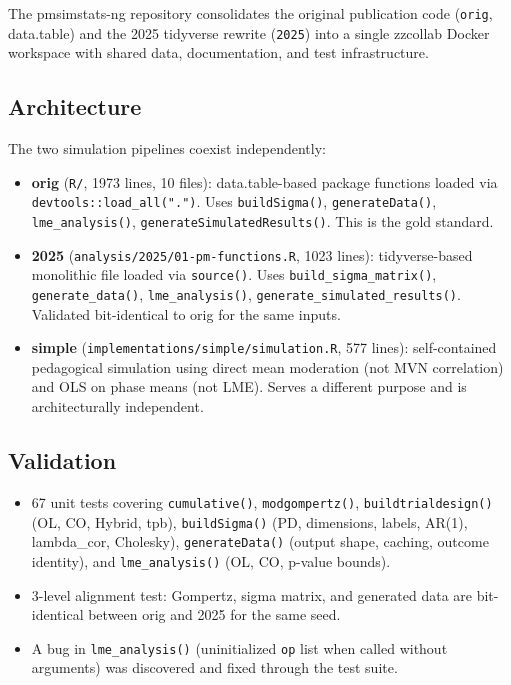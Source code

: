 \documentclass[11pt]{article}
\begin{document}
The pmsimstats-ng repository consolidates the original
publication code (\texttt{orig}, data.table) and the 2025 tidyverse
rewrite (\texttt{2025}) into a single zzcollab Docker workspace with
shared data, documentation, and test infrastructure.

\subsection{Architecture}

The two simulation pipelines coexist independently:

\begin{itemize}
  \item \textbf{orig} (\texttt{R/}, 1973 lines, 10 files): data.table-based
    package functions loaded via \texttt{devtools::load\_all(".")}. Uses
    \texttt{buildSigma()}, \texttt{generateData()}, \texttt{lme\_analysis()},
    \texttt{generateSimulatedResults()}. This is the gold standard.

  \item \textbf{2025} (\texttt{analysis/2025/01-pm-functions.R}, 1023 lines):
    tidyverse-based monolithic file loaded via \texttt{source()}. Uses
    \texttt{build\_sigma\_matrix()}, \texttt{generate\_data()}, \texttt{lme\_analysis()},
    \texttt{generate\_simulated\_results()}. Validated bit-identical to
    orig for the same inputs.

  \item \textbf{simple} (\texttt{implementations/simple/simulation.R}, 577 lines): self-contained
    pedagogical simulation using direct mean moderation (not MVN
    correlation) and OLS on phase means (not LME). Serves a
    different purpose and is architecturally independent.
\end{itemize}

\subsection{Validation}

\begin{itemize}
  \item 67 unit tests covering \texttt{cumulative()}, \texttt{modgompertz()},
    \texttt{buildtrialdesign()} (OL, CO, Hybrid, tpb), \texttt{buildSigma()}
    (PD, dimensions, labels, AR(1), lambda\_cor, Cholesky),
    \texttt{generateData()} (output shape, caching, outcome identity),
    and \texttt{lme\_analysis()} (OL, CO, p-value bounds).
  \item 3-level alignment test: Gompertz, sigma matrix, and generated
    data are bit-identical between orig and 2025 for the same seed.
  \item A bug in \texttt{lme\_analysis()} (uninitialized \texttt{op} list when called
    without arguments) was discovered and fixed through the test
    suite.
\end{itemize}
\end{document}
